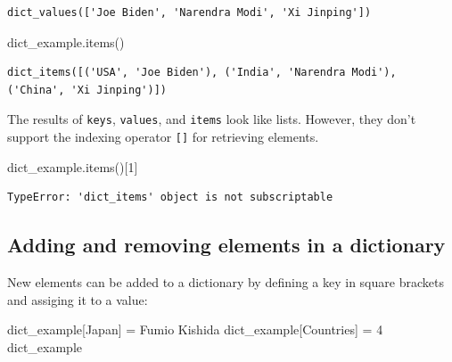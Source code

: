 \documentclass[
  letterpaper,
  DIV=11,
  numbers=noendperiod]{scrreprt}
\newenvironment{Shaded}{\begin{snugshade}}{\end{snugshade}}
\newcommand{\DecValTok}[1]{\textcolor[rgb]{0.68,0.00,0.00}{#1}}
\newcommand{\NormalTok}[1]{\textcolor[rgb]{0.00,0.23,0.31}{#1}}
\newcommand{\OperatorTok}[1]{\textcolor[rgb]{0.37,0.37,0.37}{#1}}
\newcommand{\StringTok}[1]{\textcolor[rgb]{0.13,0.47,0.30}{#1}}
\begin{document}
\begin{verbatim}
dict_values(['Joe Biden', 'Narendra Modi', 'Xi Jinping'])
\end{verbatim}

\begin{Shaded}
\begin{Highlighting}[]
\NormalTok{dict\_example.items()}
\end{Highlighting}
\end{Shaded}

\begin{verbatim}
dict_items([('USA', 'Joe Biden'), ('India', 'Narendra Modi'), ('China', 'Xi Jinping')])
\end{verbatim}

The results of \texttt{keys}, \texttt{values}, and \texttt{items} look
like lists. However, they don't support the indexing operator
\texttt{{[}{]}} for retrieving elements.

\begin{Shaded}
\begin{Highlighting}[]
\NormalTok{dict\_example.items()[}\DecValTok{1}\NormalTok{]}
\end{Highlighting}
\end{Shaded}

\begin{verbatim}
TypeError: 'dict_items' object is not subscriptable
\end{verbatim}

\hypertarget{adding-and-removing-elements-in-a-dictionary}{%
\subsection{Adding and removing elements in a
dictionary}\label{adding-and-removing-elements-in-a-dictionary}}

New elements can be added to a dictionary by defining a key in square
brackets and assiging it to a value:

\begin{Shaded}
\begin{Highlighting}[]
\NormalTok{dict\_example[}\StringTok{\textquotesingle{}Japan\textquotesingle{}}\NormalTok{] }\OperatorTok{=} \StringTok{\textquotesingle{}Fumio Kishida\textquotesingle{}}
\NormalTok{dict\_example[}\StringTok{\textquotesingle{}Countries\textquotesingle{}}\NormalTok{] }\OperatorTok{=} \DecValTok{4}
\NormalTok{dict\_example}
\end{Highlighting}
\end{Shaded}
\end{document}
